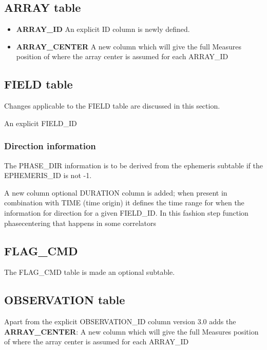 \documentclass{article}
\begin{document}
\subsection{ARRAY table}


\begin{itemize}

\item {{\bf ARRAY\_ID} An explicit ID column is newly defined}.

\item{{\bf ARRAY\_CENTER} A new column which will give the full
    Measures position of where the array center is assumed for each
    ARRAY\_ID}

\end{itemize}

\subsection{FIELD table}

Changes applicable to the FIELD table are discussed in this section.

An explicit FIELD\_ID
\subsubsection{Direction information}

The PHASE\_DIR information is to be derived from the ephemeris subtable
if the EPHEMERIS\_ID is not -1.

A new column optional DURATION column is added; when present in
combination with TIME (time origin) it defines the time range for when
the information for direction for a given FIELD\_ID. In this fashion
step function phasecentering that happens in some correlators

\subsection{FLAG\_CMD}

The FLAG\_CMD table is made an optional subtable.

\subsection{OBSERVATION table}

Apart from the explicit OBSERVATION\_ID column version 3.0 adds the
{\bf ARRAY\_CENTER}: A new column which will give the full Measures
position of where the array center is assumed for each ARRAY\_ID
\end{document}
